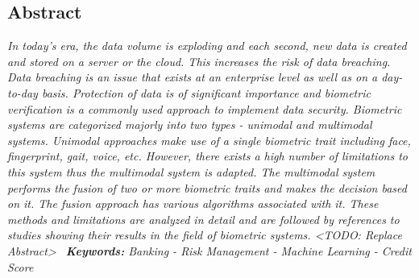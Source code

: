 \documentclass[a4paper, 12pt]{article}
\begin{document}
\newpage
\begin{center}
\section*{\centering Abstract}
\end{center}
\textit{
{\fontsize{10pt}{10pt}\selectfont In today's era, the data volume is exploding and each second, new data is created and stored on a server or the cloud. This increases the risk of data breaching. Data breaching is an issue that exists at an enterprise level as well as on a day-to-day basis. Protection of data is of significant importance and biometric verification is a commonly used approach to implement data security. Biometric systems are categorized majorly into two types - unimodal and multimodal systems. Unimodal approaches make use of a single biometric trait including face, fingerprint, gait, voice, etc. However, there exists a high number of limitations to this system thus the multimodal system is adapted. The multimodal system performs the fusion of two or more biometric traits and makes the decision based on it. The fusion approach has various algorithms associated with it. These methods and limitations are analyzed in detail and are followed by references to studies showing their results in the field of biometric systems. <TODO: Replace Abstract>
}
}
\vskip 0.1in
\noindent\
\emph{
{\fontsize{10pt}{10pt}\selectfont \textbf{Keywords:}  Banking - Risk Management - Machine Learning - Credit Score}}
\end{document}
